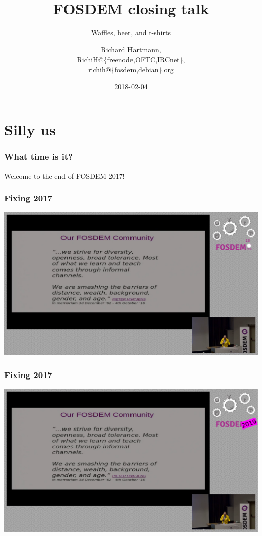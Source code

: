 \documentclass[t]{beamer}
\title{FOSDEM closing talk}
\subtitle{Waffles, beer, and t-shirts}
\author{Richard Hartmann,\\
RichiH@\{freenode,OFTC,IRCnet\},\\
richih@\{fosdem,debian\}.org}
\date{2018-02-04}
\begin{document}
\setcounter{tocdepth}{1}

\begin{frame}
	\titlepage
\end{frame}




\section{Silly us}

\begin{frame}
	\frametitle{What time is it?}
	\vfill
	Welcome to the end of FOSDEM 2017!
	\vfill
\end{frame}

\begin{frame}
	\frametitle{Fixing 2017}
	\vfill
		\includegraphics[scale=0.2]{images/fix2017-1.png}
	\vfill
\end{frame}

\begin{frame}
	\frametitle{Fixing 2017}
	\vfill
		\includegraphics[scale=0.15]{images/fix2017_manual.png}
	\vfill
\end{frame}
\end{document}
